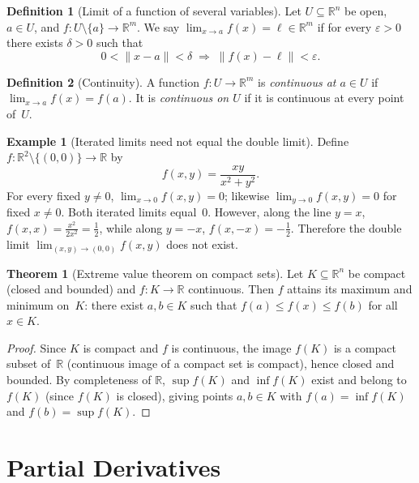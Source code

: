\documentclass[12pt,a4paper]{book}
\theoremstyle{definition}
\newtheorem{definition}{Definition}[chapter]
\newtheorem{theorem}{Theorem}[chapter]
\newtheorem{example}{Example}[chapter]
\begin{document}
\begin{definition}[Limit of a function of several variables]\label{def:limit-Rn}
Let $U\subseteq\mathbb{R}^n$ be open, $a\in U$, and
$f\colon U\setminus\{a\}\to\mathbb{R}^m$.  We say
$\lim_{x\to a} f(x)=\ell\in\mathbb{R}^m$ if for every $\varepsilon>0$
there exists $\delta>0$ such that
\[
  0<\|x-a\|<\delta \;\Longrightarrow\; \|f(x)-\ell\|<\varepsilon.
\]
\end{definition}

\begin{definition}[Continuity]\label{def:continuity-Rn}
A function $f\colon U\to\mathbb{R}^m$ is \emph{continuous at $a\in U$} if
$\lim_{x\to a}f(x)=f(a)$.  It is \emph{continuous on $U$} if it is
continuous at every point of~$U$.
\end{definition}

\begin{example}[Iterated limits need not equal the double limit]
\label{ex:iterated-limits}
Define $f\colon\mathbb{R}^2\setminus\{(0,0)\}\to\mathbb{R}$ by
\[
  f(x,y)=\frac{xy}{x^2+y^2}.
\]
For every fixed $y\ne 0$, $\lim_{x\to 0}f(x,y)=0$; likewise
$\lim_{y\to 0}f(x,y)=0$ for fixed $x\ne 0$.  Both iterated limits equal~$0$.
However, along the line $y=x$, $f(x,x)=\tfrac{x^2}{2x^2}=\tfrac12$, while
along $y=-x$, $f(x,-x)=-\tfrac12$.  Therefore the double limit
$\lim_{(x,y)\to(0,0)}f(x,y)$ does not exist.
\end{example}

\begin{theorem}[Extreme value theorem on compact sets]
\label{thm:extreme-value-Rn}
Let $K\subseteq\mathbb{R}^n$ be compact (closed and bounded) and
$f\colon K\to\mathbb{R}$ continuous.  Then $f$ attains its maximum and
minimum on~$K$: there exist $a,b\in K$ such that $f(a)\le f(x)\le f(b)$
for all $x\in K$.
\end{theorem}

\begin{proof}
Since $K$ is compact and $f$ is continuous, the image $f(K)$ is a compact
subset of~$\mathbb{R}$ (continuous image of a compact set is compact), hence
closed and bounded.  By completeness of $\mathbb{R}$, $\sup f(K)$ and
$\inf f(K)$ exist and belong to $f(K)$ (since $f(K)$ is closed), giving
points $a,b\in K$ with $f(a)=\inf f(K)$ and $f(b)=\sup f(K)$.
\end{proof}

\section{Partial Derivatives}
\label{sec:partial-derivatives}
\end{document}
